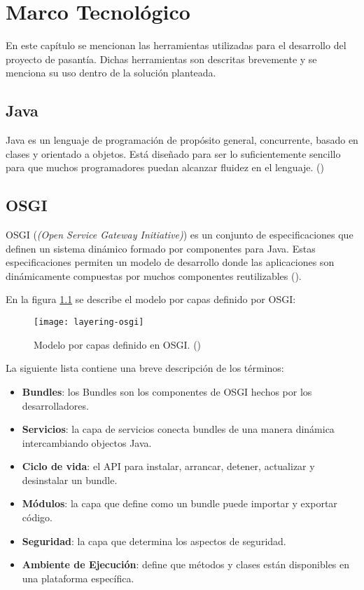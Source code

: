 \chapter{Marco Tecnológico}
\label{capitulo3}

En este capítulo se mencionan las herramientas utilizadas para el desarrollo
del proyecto de pasantía. Dichas herramientas son descritas brevemente y se menciona
su uso dentro de la solución planteada.

\section{Java}

Java es un lenguaje de programación de propósito general, concurrente, basado en clases
y orientado a objetos. Está diseñado para ser lo suficientemente sencillo para
que muchos programadores puedan alcanzar fluidez en el lenguaje. (\cite{JAVA})

\section{OSGI}

OSGI (\emph{(Open Service Gateway Initiative)}) es un conjunto de especificaciones
que definen un sistema dinámico formado por componentes
para Java. Estas especificaciones permiten un modelo de desarrollo donde las aplicaciones
son dinámicamente compuestas por muchos componentes reutilizables (\cite{OSGI}).

En la figura \ref{layers} se describe el modelo por capas definido por OSGI:

\begin{figure}[h!]
\centering
\texttt{[image: layering-osgi]}
\caption[Capas de OSGI]{Modelo por capas definido en OSGI. (\cite{OSGI})}
\label{layers}
\end{figure}

La siguiente lista contiene una breve descripción de los términos:
\begin{itemize}
\item \textbf{Bundles}: los Bundles son los componentes de OSGI hechos por los desarrolladores.
\item \textbf{Servicios}: la capa de servicios conecta bundles de una manera dinámica intercambiando objectos Java.
\item \textbf{Ciclo de vida}: el API para instalar, arrancar, detener, actualizar y desinstalar un bundle.
\item \textbf{Módulos}: la capa que define como un bundle puede importar y exportar código.
\item \textbf{Seguridad}: la capa que determina los aspectos de seguridad.
\item \textbf{Ambiente de Ejecución}: define que métodos y clases están disponibles en una plataforma específica.
\end{itemize}


